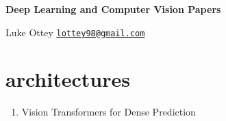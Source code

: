 \documentclass[acmlarge]{acmart}
\author{Luke Ottey}
\begin{document}
\begin{center}
\textbf{Deep Learning and Computer Vision Papers}
\end{center}
Luke Ottey
\newline
\href{mailto:lottey98@gmail.com}{\nolinkurl{lottey98@gmail.com}} 
\singlespacing
\tableofcontents
\newpage
{}
\section{architectures}
\begin{enumerate}
	\subsection{activations}
	\begin{enumerate}
		\item Searching for Activation Functions \cite{Ramachandran2018SearchingFA}
	\end{enumerate}
	\subsection{normalizations}
	\begin{enumerate}
	\end{enumerate}
	\subsection{transformers}
	\begin{enumerate}
		\item Vision Transformers for Dense Prediction \cite{Ranftl2021VisionTF}
	\end{enumerate}
	\item Vision Transformers for Dense Prediction \cite{Ranftl2021VisionTF}
\end{enumerate}
\end{document}
